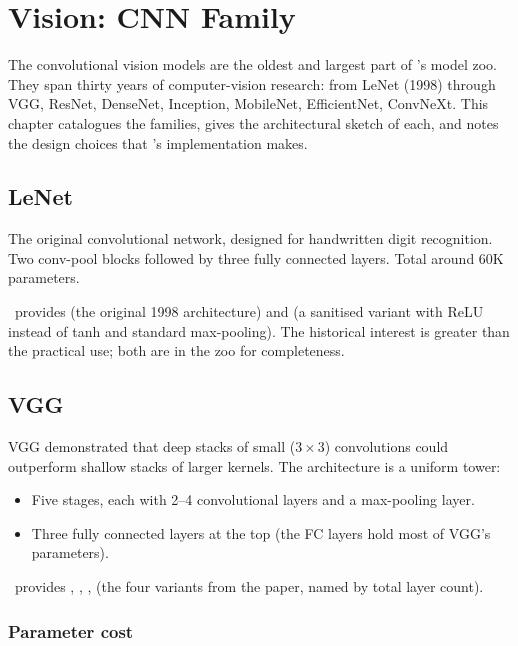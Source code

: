 \chapter{Vision: CNN Family}
\label{ch:vision_cnn}

The convolutional vision models are the oldest and largest part
of \Lucid's model zoo. They span thirty years of computer-vision
research: from LeNet (1998) through VGG, ResNet, DenseNet,
Inception, MobileNet, EfficientNet, ConvNeXt. This chapter
catalogues the families, gives the architectural sketch of each,
and notes the design choices that \Lucid's implementation makes.

\section{LeNet}
\label{sec:vision_cnn:lenet}

The original convolutional network, designed for handwritten
digit recognition. Two conv-pool blocks followed by three fully
connected layers. Total around 60K parameters.

\Lucid\ provides  (the original 1998 architecture)
and  (a sanitised variant with ReLU instead
of tanh and standard max-pooling). The historical interest is
greater than the practical use; both are in the zoo for
completeness.

\section{VGG}
\label{sec:vision_cnn:vgg}

VGG \cite{simonyan_vgg_2014} demonstrated that deep stacks of
small ($3 \times 3$) convolutions could outperform shallow stacks
of larger kernels. The architecture is a uniform tower:

\begin{itemize}
  \item Five stages, each with 2--4 convolutional layers and a
    max-pooling layer.
  \item Three fully connected layers at the top (the FC layers
    hold most of VGG's parameters).
\end{itemize}

\Lucid\ provides , , ,
 (the four variants from the paper, named by
total layer count).

\subsection{Parameter cost}
\label{ssec:vision_cnn:vgg_params}

